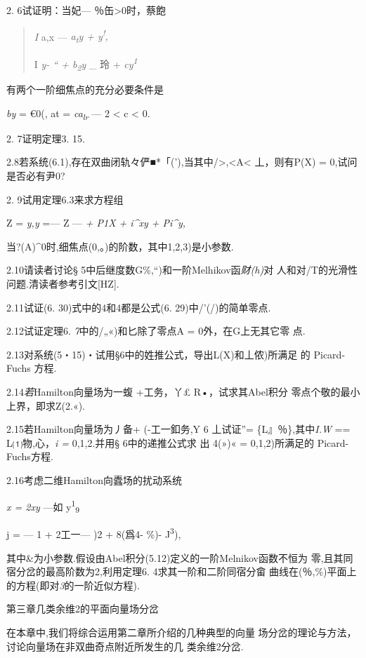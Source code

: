 \documentclass{article}
\begin{document}
2. 6试证明：当妃--- ％缶\textgreater{}0时，蔡飽

\begin{quote}
\emph{I} a,x --- \emph{a\textsubscript{t}y + y\textsuperscript{!},}

I \emph{y- `` + b\textsubscript{2}y} \_ 玲 +
\emph{cy\textsuperscript{1}}
\end{quote}

有两个一阶细焦点的充分必要条件是

\emph{by} = €0(, at = \emph{ca\textsubscript{lr}} --- 2 \textless{} c
\textless{} 0.

2. 7证明定理3. 15.

2.8若系统(6.1),存在双曲闭轨々俨■*「('),当其中/\textgreater{},\textless{}A\textless{}
丄，则有P(X) = 0,试问是否必有尹0?

2. 9试用定理6.3来求方程组

Z = \emph{y,y} =--- Z --- \emph{+ P1X + i\^{}xy + Pi\^{}y,}

当?(A)\^{}0时,细焦点(0,。)的阶数，其中1,2,3)是小参数.

2.10请读者讨论§ 5中后继度数G\%,``)和一阶Melhikov函\emph{财(h)}对
人和对/T的光滑性问题.清读者参考引文{[}HZ{]}.

2.11试证(6. 30)式中的4和4都是公式(6. 29)中/'(/)的简单零点.

2.12试证定理6. \emph{7}中的/„«)和匕除了零点A = 0外，在G上无其它零 点.

2.13对系统(5・15)・试用§6中的姓推公式，导出L(X)和丄侬)所满足 的
Picard-Fuchs 方程.

2.14\emph{若}Hamilton向量场为一蝮 +工务，丫£ R•，试求其Abel积分
零点个敬的最小上界，即求Z(2.«).

2.15若Hamilton向量场为丿备+ (-工一釦务,Y 6 丄试证''=
\{L』％\},其中\emph{I.W} == L⑴物,心，\emph{i =} 0,1,2.并用§
6中的递推公式求 出 4(»)« = 0,1,2)所满足的 Picard-Fuchs方程.

2.16考虑二维Hamilton向蠹场的扰动系统

\emph{x = 2xy} ---如 y\textsuperscript{1}\textsubscript{9}

j = --- 1 + 2工一--- )2 + 8(爲4- \%)- J\textsuperscript{3}),

其中\&为小参数.假设由Abel积分(5.12)定义的一阶Melnikov函数不恒为
零,且其同宿分岔的最高阶数为2,利用定理6. 4求其一阶和二阶同宿分畲
曲线在(％,\%)平面上的方程(即对\emph{3}的一阶近似方程).

\protect\hypertarget{bookmark123}{}{}第三章几类余维2的平面向量场分岔

在本章中,我们将综合运用第二章所介绍的几种典型的向量
场分岔的理论与方法，讨论向量场在非双曲奇点附近所发生的几 类余维2分岔.
\end{document}
